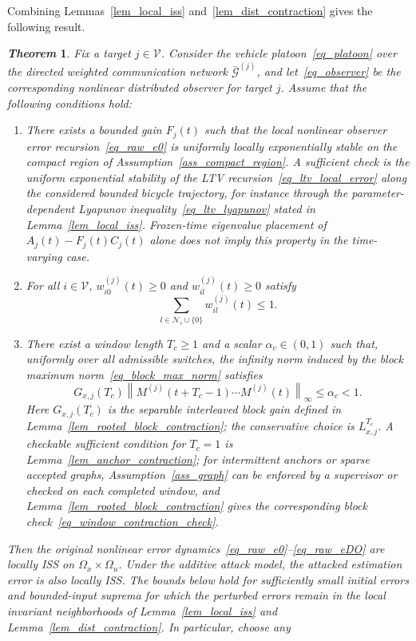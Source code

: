 \documentclass[letterpaper,journal]{IEEEtran}
\def\V{\mathcal{V}} %
\def\G{\mathcal{G}} %
\def\N{\mathcal{N}} %
\newtheorem{theorem}{\it Theorem}%
\begin{document}
Combining Lemmas~\ref{lem_local_iss} and~\ref{lem_dist_contraction} gives the following result.
\begin{theorem}\label{thm_observer}
Fix a target $j\in\V$. Consider the vehicle platoon~\eqref{eq_platoon} over the directed weighted communication network $\bar{\G}^{(j)}$, and let~\eqref{eq_observer} be the corresponding nonlinear distributed observer for target $j$. Assume that the following conditions hold:
\begin{enumerate}
    \item There exists a bounded gain $F_{j}(t)$ such that the local nonlinear observer error recursion~\eqref{eq_raw_e0} is uniformly locally exponentially stable on the compact region of Assumption~\ref{ass_compact_region}. A sufficient check is the uniform exponential stability of the LTV recursion~\eqref{eq_ltv_local_error} along the considered bounded bicycle trajectory, for instance through the parameter-dependent Lyapunov inequality~\eqref{eq_ltv_lyapunov} stated in Lemma~\ref{lem_local_iss}. Frozen-time eigenvalue placement of $A_j(t)-F_j(t)C_j(t)$ alone does not imply this property in the time-varying case.
    \item For all $i \in \V$, $w_{i0}^{(j)}(t) \geq 0$ and $w_{il}^{(j)}(t) \geq 0$ satisfy
    \begin{equation}\label{thm_W}%
    \sum_{l\in \N_i\cup\{0\}} w_{il}^{(j)}(t) \leq 1.
    \end{equation}
    \item There exist a window length $T_c\ge1$ and a scalar $\alpha_c\in(0,1)$ such that, uniformly over all admissible switches, the infinity norm induced by the block maximum norm~\eqref{eq_block_max_norm} satisfies
    \begin{equation} \label{assume3}
    G_{x,j}(T_c)
    \left\|M^{(j)}(t+T_c-1)\cdots M^{(j)}(t)\right\|_\infty
    \le \alpha_c<1.
    \end{equation}
    Here $G_{x,j}(T_c)$ is the separable interleaved block gain defined in Lemma~\ref{lem_rooted_block_contraction}; the conservative choice is $L_{x,j}^{T_c}$. A checkable sufficient condition for $T_c=1$ is Lemma~\ref{lem_anchor_contraction}; for intermittent anchors or sparse accepted graphs, Assumption~\ref{ass_graph} can be enforced by a supervisor or checked on each completed window, and Lemma~\ref{lem_rooted_block_contraction} gives the corresponding block check~\eqref{eq_window_contraction_check}.
\end{enumerate}
Then the original nonlinear error dynamics~\eqref{eq_raw_e0}--\eqref{eq_raw_eDO} are locally ISS on $\Omega_x\times\Omega_u$. Under the additive attack model, the attacked estimation error is also locally ISS. The bounds below hold for sufficiently small initial errors and bounded-input suprema for which the perturbed errors remain in the local invariant neighborhoods of Lemma~\ref{lem_local_iss} and Lemma~\ref{lem_dist_contraction}. In particular, choose any

\end{theorem}
\end{document}

